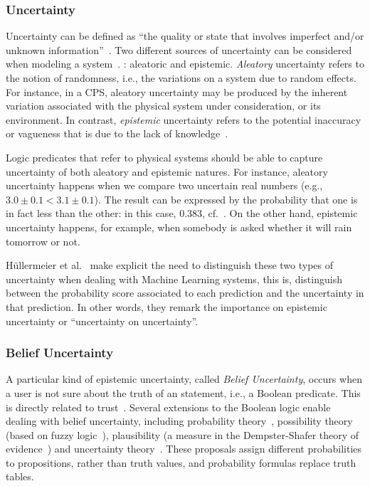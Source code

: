 \subsubsection{Uncertainty}

Uncertainty can be defined as ``the quality or state that involves imperfect and/or unknown information''~\cite{JCGM100:2008}. 
Two different sources of uncertainty can be considered when modeling a system~\cite{OBERKAMPF2002333,Thunnissen03,ZhangSAYON16,Zhang2017,PSUM}. %
: aleatoric and epistemic.
{\emph{Aleatory} uncertainty refers to the notion of randomness, i.e., the variations on a system due to random effects. For instance, in a CPS, aleatory uncertainty may be produced by the inherent variation associated with the physical system under consideration, or its environment. In contrast, \emph{epistemic} uncertainty refers to the potential inaccuracy or vagueness that is due to the lack of knowledge~\cite{OBERKAMPF2002333}.} 

Logic predicates that refer to physical systems should be able to capture uncertainty of both aleatory and epistemic natures. For instance, aleatory uncertainty happens when we compare two uncertain real numbers (e.g., $3.0\pm 0.1 < 3.1\pm 0.1$). The result can be expressed by the probability that one is in fact less than the other: in this case, 0.383, cf.~\cite{BBMV19}. On the other hand, epistemic uncertainty happens, for example, when somebody is asked whether it will rain tomorrow or not.

Hüllermeier et al.~\cite{hllermeier2019aleatoric} make explicit the need to distinguish these two types of uncertainty when dealing with Machine Learning systems, this is, distinguish between the probability score associated to each prediction and the uncertainty in that prediction. In other words, they remark the importance on epistemic uncertainty or ``uncertainty on uncertainty''.

\subsubsection{Belief Uncertainty}

A particular kind of epistemic uncertainty, called \emph{Belief Uncertainty}, occurs when a user is not sure about the truth of an statement, i.e., a Boolean predicate. %
This is directly related to trust~\cite{JosangKD05}.  
Several extensions to the Boolean logic enable dealing with belief uncertainty, including probability theory~\cite{Feller08,Finetti2017}, possibility theory (based on fuzzy logic~\cite{Zimmerman01,RussellNorvig2010}), plausibility (a measure in the Dempster-Shafer theory of evidence~\cite{Shafer76}) and uncertainty theory~\cite{UncertaintyTheory}. 
These proposals assign different probabilities to propositions, rather than truth values, and probability formulas replace truth tables. 

